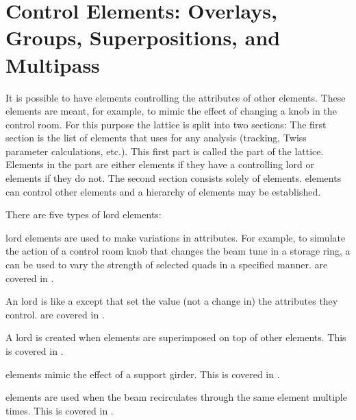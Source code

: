 \chapter[Overlays, Groups, Superpositions, and Multipass]
{Control Elements: Overlays, Groups, Superpositions, and Multipass}
\label{c:control}

It is possible to have elements controlling the attributes of other
elements. These  elements are meant, for example, to mimic
the effect of changing a knob in the control room. For this purpose
the lattice is split into two sections: The first section is the list
of elements that \bmad uses for any analysis (tracking, Twiss
parameter calculations, etc.). This first part is called the
 part of the lattice.
Elements in the  part are either
 elements if they have a controlling lord or 
elements if they do not. The second section consists solely of
 elements.  elements can control other 
elements and a hierarchy of  elements may be established.

There are five types of lord elements: 
\begin{Itemize}
\item 
{}
 lord elements are used to make variations in
attributes. For example, to simulate the action of a control room knob
that changes the beam tune in a storage ring, a  can be used
to vary the strength of selected quads in a specified
manner.  are covered in .
\item
{}
An  lord is like a  except that 
set the value (not a change in) the attributes they
control.  are covered in .
\item
A  lord is created when elements are superimposed on
top of other elements. This is covered in .
\item
{}
 elements mimic the effect of a support girder. This is
covered in .
\item
{}
 elements are used when the beam recirculates through
the same element multiple times. This is covered in
.
\end{Itemize}

